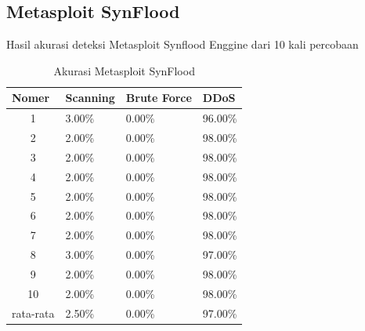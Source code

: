 \subsection{Metasploit SynFlood}
Hasil akurasi deteksi Metasploit Synflood Enggine dari 10 kali percobaan
\begin{table}[H]
	\centering
	\caption{Akurasi Metasploit SynFlood}
	\label{Akurasi Metasploit SynFlood}
	\begin{tabular}{|c|l|l|l|}
		\hline
		\multicolumn{1}{|l|}{Nomer}     & Scanning & Brute Force & DDoS    \\ \hline
		1                               & 3.00\%   & 0.00\%      & 96.00\% \\ \hline
		2                               & 2.00\%   & 0.00\%      & 98.00\% \\ \hline
		3                               & 2.00\%   & 0.00\%      & 98.00\% \\ \hline
		4                               & 2.00\%   & 0.00\%      & 98.00\% \\ \hline
		5                               & 2.00\%   & 0.00\%      & 98.00\% \\ \hline
		6                               & 2.00\%   & 0.00\%      & 98.00\% \\ \hline
		7                               & 2.00\%   & 0.00\%      & 98.00\% \\ \hline
		8                               & 3.00\%   & 0.00\%      & 97.00\% \\ \hline
		9                               & 2.00\%   & 0.00\%      & 98.00\% \\ \hline
		10                              & 2.00\%   & 0.00\%      & 98.00\% \\ \hline
		\multicolumn{1}{|l|}{rata-rata} & 2.50\%   & 0.00\%      & 97.00\% \\ \hline
	\end{tabular}
\end{table}



